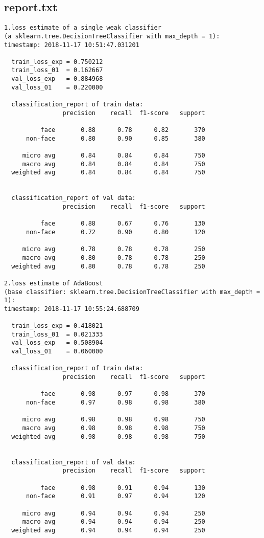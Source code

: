 \documentclass[journal, a4paper]{IEEEtran}
\begin{document}
\begin{mulitcols}{2}
\subsection{report.txt}
\begin{lstlisting}
1.loss estimate of a single weak classifier 
(a sklearn.tree.DecisionTreeClassifier with max_depth = 1):
timestamp: 2018-11-17 10:51:47.031201

  train_loss_exp = 0.750212
  train_loss_01  = 0.162667
  val_loss_exp   = 0.884968
  val_loss_01    = 0.220000

  classification_report of train data:
                precision    recall  f1-score   support

          face       0.88      0.78      0.82       370
      non-face       0.80      0.90      0.85       380

     micro avg       0.84      0.84      0.84       750
     macro avg       0.84      0.84      0.84       750
  weighted avg       0.84      0.84      0.84       750


  classification_report of val data:
                precision    recall  f1-score   support

          face       0.88      0.67      0.76       130
      non-face       0.72      0.90      0.80       120

     micro avg       0.78      0.78      0.78       250
     macro avg       0.80      0.78      0.78       250
  weighted avg       0.80      0.78      0.78       250
    
2.loss estimate of AdaBoost 
(base classifier: sklearn.tree.DecisionTreeClassifier with max_depth = 1):
timestamp: 2018-11-17 10:55:24.688709
    
  train_loss_exp = 0.418021
  train_loss_01  = 0.021333
  val_loss_exp   = 0.508904
  val_loss_01    = 0.060000

  classification_report of train data:
                precision    recall  f1-score   support

          face       0.98      0.97      0.98       370
      non-face       0.97      0.98      0.98       380

     micro avg       0.98      0.98      0.98       750
     macro avg       0.98      0.98      0.98       750
  weighted avg       0.98      0.98      0.98       750


  classification_report of val data:
                precision    recall  f1-score   support

          face       0.98      0.91      0.94       130
      non-face       0.91      0.97      0.94       120

     micro avg       0.94      0.94      0.94       250
     macro avg       0.94      0.94      0.94       250
  weighted avg       0.94      0.94      0.94       250

\end{lstlisting}
\end{mulitcols}
\end{document}
